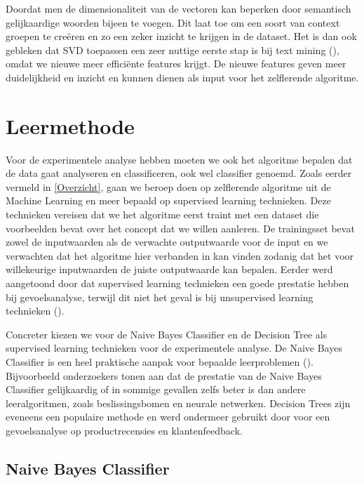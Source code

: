 Doordat men de dimensionaliteit van de vectoren kan beperken door semantisch gelijkaardige woorden bijeen te voegen. Dit laat toe om een soort van context groepen te cre\"eren en zo een zeker inzicht te krijgen in de dataset. Het is dan ook gebleken dat SVD toepassen een zeer nuttige eerste stap is bij text mining (\cite{maas2011learnin}), omdat we nieuwe meer effici\"ente features krijgt. De nieuwe features geven meer duidelijkheid en inzicht en kunnen dienen als input voor het zelflerende algoritme.

\section{Leermethode}\label{Leermethode}

Voor de experimentele analyse hebben moeten we ook het algoritme bepalen dat de data gaat analyseren en classificeren, ook wel classifier genoemd. Zoals eerder vermeld in \ref{Overzicht}, gaan we beroep doen op zelflerende algoritme uit de Machine Learning en meer bepaald op supervised learning technieken. Deze technieken vereisen dat we het algoritme eerst traint met een dataset die voorbeelden bevat over het concept dat we willen aanleren. De trainingsset bevat zowel de inputwaarden als de verwachte outputwaarde voor de input en we verwachten dat het algoritme hier verbanden in kan vinden zodanig dat het voor willekeurige inputwaarden de juiste outputwaarde kan bepalen. Eerder werd aangetoond door \cite{ye2009sentiment} dat supervised learning technieken een goede prestatie hebben bij gevoelsanalyse, terwijl dit niet het geval is bij unsupervised learning technieken (\cite{rothfels2010unsupervised}).


Concreter kiezen we voor de Naive Bayes Classifier en de Decision Tree als supervised learning technieken voor de experimentele analyse. De Naive Bayes Classifier is een heel praktische aanpak voor bepaalde leerproblemen (\cite{mitchell1997machine}). Bijvoorbeeld onderzoekers \cite{Michie94machinelearning} tonen aan dat de prestatie van de Naive Bayes Classifier gelijkaardig of in sommige gevallen zelfs beter is dan andere leeralgoritmen, zoals beslissingsbomen en neurale netwerken. Decision Trees zijn eveneens een populaire methode en werd ondermeer gebruikt door \cite{zhang2008sentiment} voor een gevoelsanalyse op productrecensies en klantenfeedback.

\subsection{Naive Bayes Classifier}\label{Naive Bayes Classifier}

